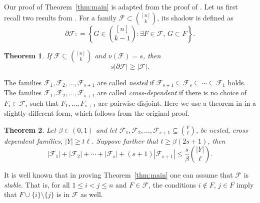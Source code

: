 \documentclass{amsart}
\newtheorem{theorem}{Theorem}
\theoremstyle{plain}
\numberwithin{equation}{section}
\numberwithin{theorem}{section}
\numberwithin{case}{section}
\numberwithin{subcase}{case}
\begin{document}
Our proof of Theorem~\ref{thm:main} is adapted from the proof of \cite[Theorem 1.1]{Frankl13}.
Let us first recall two results from \cite{Frankl13}.
For a family ${\mathcal{F}}\subset \binom{[n]}k$, its shadow is defined as
\[
\partial {\mathcal{F}} : = \left\{ G\in \binom{[n]}{k-1}: \exists F\in {\mathcal{F}},\, G\subset F \right\}.
\]

\begin{theorem}\cite[Theorem 1.2]{Frankl13}\label{thm:shadow}
If ${\mathcal{F}}\subseteq \binom{[n]}{k}$ and $\nu({\mathcal{F}}) = s$, then
\[
s|\partial{\mathcal{F}}|\ge |{\mathcal{F}}|.
\]
\end{theorem}

The families ${\mathcal{F}}_1, {\mathcal{F}}_2,\dots, {\mathcal{F}}_{s+1}$ are called \emph{nested} if ${\mathcal{F}}_{s+1}\subseteq {\mathcal{F}}_s \subseteq \cdots \subseteq {\mathcal{F}}_1$ holds.
The families ${\mathcal{F}}_1, {\mathcal{F}}_2,\dots, {\mathcal{F}}_{s+1}$ are called \emph{cross-dependent} if there is no choice of $F_i\in {\mathcal{F}}_i$ such that $F_1,\dots, F_{s+1}$ are pairwise disjoint.
Here we use a theorem in \cite{Frankl13} in a slightly different form, which follows from the original proof.

\begin{theorem}\cite[Theorem 3.1]{Frankl13}\label{thm:ineq}
Let $\beta\in (0,1)$ and let ${\mathcal{F}}_1,{\mathcal{F}}_2,\dots, {\mathcal{F}}_{s+1}\subseteq \binom{Y}{\ell}$, be nested, cross-dependent families, $|Y|\ge t\ell$. Suppose further that $t\ge \beta(2s+1)$, then
\[
|{\mathcal{F}}_1|+|{\mathcal{F}}_2|+\cdots+ |{\mathcal{F}}_{s}| + (s+1)|{\mathcal{F}}_{s+1}|\le \frac{s}\beta\binom{|Y|}{\ell}.
\]
\end{theorem}

It is well known that in proving Theorem~\ref{thm:main} one can assume that ${\mathcal{F}}$ is \emph{stable}.
That is, for all $1\le i<j\le n$ and $F\in {\mathcal{F}}$, the conditions $i\notin F$, $j\in F$ imply that $F\cup \{i\}\setminus \{j\}$ is in ${\mathcal{F}}$ as well.
\end{document}
